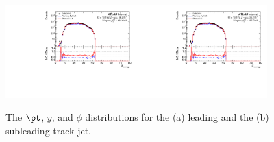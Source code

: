 \begin{figure}[h!]
  \includegraphics[page=88,width=0.45\textwidth]{figures/ZjetOmnifoldMCDataComp.pdf}\includegraphics[page=92,width=0.45\textwidth]{figures/ZjetOmnifoldMCDataComp.pdf} \\
  \caption{The $\pt$, $y$, and $\phi$ distributions for the (a) leading and the (b) subleading track jet.}
  \label{fig:pTyjets}
\end{figure}

